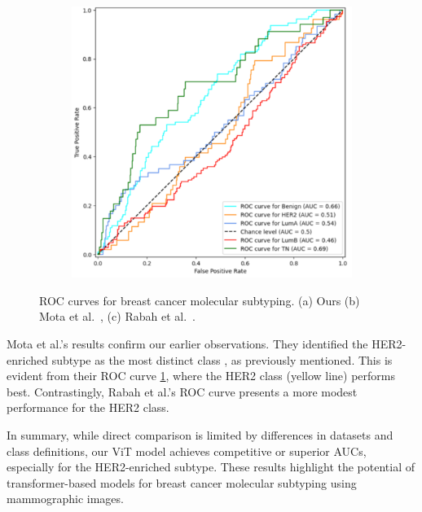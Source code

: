 \documentclass[a4paper,10pt]{book}
\begin{document}
\begin{figure}[h!]
\begin{subfigure}[t]{0.32\textwidth}
        \caption{}
        \label{fig:mota_auc}
    \end{subfigure}
    \begin{subfigure}[t]{0.32\textwidth}
        \centering
        \includegraphics[width=\textwidth]{reports/assets/rabaMulticlass.png}
        \caption{}
        \label{fig:rabah_auc}
    \end{subfigure}
    \caption[Studies AUC Comparison]{ROC curves for breast cancer molecular subtyping. (a) Ours (b) Mota et al.~\cite{mota_breast_2024}, (c)  Rabah et al.~\cite{ben_rabah_multimodal_2025}.}
    \label{fig:auc_comparison}
\end{figure}

Mota et al.'s results confirm our earlier observations. They identified the HER2-enriched subtype as the most distinct class \cite{mota_breast_2024}, as previously mentioned. This is evident from their ROC curve \ref{fig:mota_auc}, where the HER2 class (yellow line) performs best. Contrastingly, Rabah et al.'s ROC curve presents a more modest performance for the HER2 class.

In summary, while direct comparison is limited by differences in datasets and class definitions, our ViT model achieves competitive or superior AUCs, especially for the HER2-enriched subtype. These results highlight the potential of transformer-based models for breast cancer molecular subtyping using mammographic images.
\end{document}

